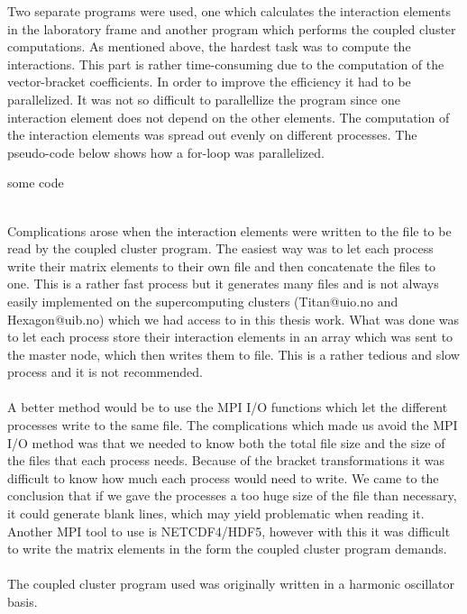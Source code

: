 Two separate programs were used, one which calculates the interaction elements in
the laboratory frame and another program which performs the coupled cluster
computations. As mentioned above, the hardest task was to compute the interactions. This part is rather
time-consuming  due to the computation of the vector-bracket coefficients.  In order to improve
the efficiency it had to be parallelized. It was not so difficult to parallellize the program since one interaction element does not depend on the other elements. 
The computation of the interaction elements was 
spread out evenly on different processes.  
The pseudo-code below shows how a for-loop was parallelized.
\begin{algorithm}
\begin{algorithmic}
         \STATE   some code
        \ENDFOR
\end{algorithmic}
\end{algorithm}\\
Complications
arose when the interaction elements were written to the file to be read by the coupled cluster
program.  The easiest way was to let each process write their matrix elements
to their own file and then concatenate the files to one. This is a rather fast
process but it generates many files and is not always easily implemented on the supercomputing
clusters (Titan@uio.no and Hexagon@uib.no) which we had access to in this thesis work.
What was done was to let each process store their interaction elements in
an array which was sent to the master node, which then writes them to file. This
is a rather tedious and slow process and it is not recommended.\\
\\
A better method
would be to use the MPI I/O functions which let the different 
processes write to the
same file. The complications which made us avoid the MPI I/O method was that we
needed to know both the total file size and the size of the files that 
each process needs.
Because of the bracket transformations it was difficult to 
know how much each process would need to
write. We came to the conclusion that if we gave the processes a too huge size
of the file than necessary, it could generate blank lines, which may yield problematic when reading it. Another MPI tool to use is NETCDF4/HDF5, however with this it was difficult to write the matrix elements in the form the coupled cluster
program demands.\\
\\
The coupled cluster program used was originally written in a harmonic oscillator basis. 
